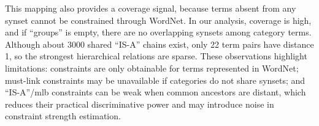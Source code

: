 This mapping also provides a coverage signal, because terms absent from any synset cannot be constrained through WordNet.
In our analysis, coverage is high, and if ``groups'' is empty, there are no overlapping synsets among category terms.
Although about 3000 shared ``IS-A'' chains exist, only 22 term pairs have distance 1, so the strongest hierarchical relations are sparse.
These observations highlight limitations: constraints are only obtainable for terms represented in WordNet; must-link constraints may be unavailable if categories do not share synsets; and ``IS-A''/\ac{mlb} constraints can be weak when common ancestors are distant, which reduces their practical discriminative power and may introduce noise in constraint strength estimation.
